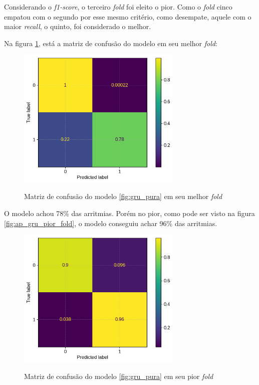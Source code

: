 Considerando o \textit{f1-score}, o terceiro \textit{fold} foi eleito o pior. Como o \textit{fold} cinco empatou com o segundo por 
esse mesmo critério, como desempate, aquele com o maior \textit{recall}, o quinto, foi considerado o melhor. 

Na figura \ref{fig:matriz_confusao_melhor_fold_gru}, está a matriz de  confusão do modelo em seu melhor \textit{fold}:

\begin{figure}[H]
  \centering
  \caption{Matriz de confusão do modelo \ref{fig:gru_pura} em seu melhor \textit{fold}}
   \includegraphics[width=0.7\textwidth]{figuras/modelos_resultados/gru/matriz_confusao_melhor_fold_gru.png} %
  \label{fig:matriz_confusao_melhor_fold_gru}
\end{figure}

O modelo achou 78\% das arritmias. Porém no pior, como pode ser visto na figura \ref{fig:ap_gru_pior_fold}, o modelo conseguiu achar 96\% das arritmias.

\begin{figure}[H]
  \centering
  \caption{Matriz de confusão do modelo \ref{fig:gru_pura} em seu pior \textit{fold}}
   \includegraphics[width=0.7\textwidth]{figuras/modelos_resultados/gru/matriz_confusao_pior_fold_gru.png} %
  \label{fig:matriz_confusao_pior_fold_gru}
\end{figure}

